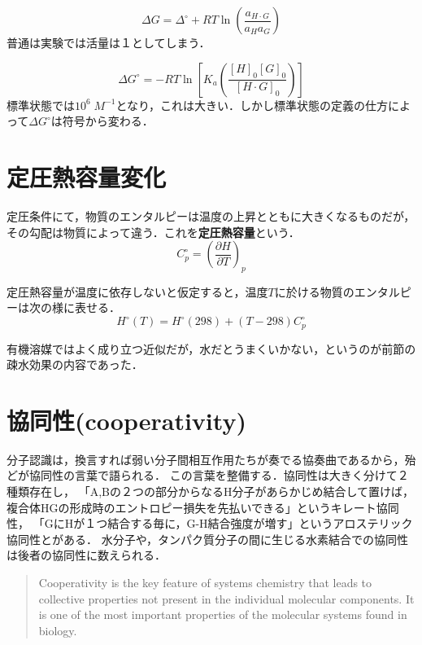 \documentclass[uplatex, dvipdfmx]{jsreport}
\begin{document}
\begin{remark}[標準状態と化学反応]
    \[\Delta G=\Delta^\circ + RT\ln\left(\frac{a_{H\cdot G}}{a_Ha_G}\right)\]
    普通は実験では活量は１としてしまう．

    \[ \Delta G^\circ = -RT\ln\left[K_a\left(\frac{[H]_0[G]_0}{[H\cdot G]_0}\right)\right] \]
    標準状態では$10^6\;M^{-1}$となり，これは大きい．しかし標準状態の定義の仕方によって$\Delta G^\circ$は符号から変わる．
\end{remark}

\section{定圧熱容量変化}

\begin{definition}[定圧熱容量]
    定圧条件にて，物質のエンタルピーは温度の上昇とともに大きくなるものだが，その勾配は物質によって違う．これを\textbf{定圧熱容量}という．
    \[C_p^\circ = \left(\frac{\partial H}{\partial T}\right)_p\]
\end{definition}
\begin{proposition}[enthalpyと定圧熱容量]
    定圧熱容量が温度に依存しないと仮定すると，温度$T$に於ける物質のエンタルピーは次の様に表せる．
    \[H^\circ(T)=H^\circ(298)+(T-298)C^\circ_p\]
\end{proposition}
\begin{remark}
    有機溶媒ではよく成り立つ近似だが，水だとうまくいかない，というのが前節の疎水効果の内容であった．
\end{remark}

\section{協同性(cooperativity)}
分子認識は，換言すれば弱い分子間相互作用たちが奏でる協奏曲であるから，殆どが協同性の言葉で語られる．
この言葉を整備する．協同性は大きく分けて２種類存在し，
「A,Bの２つの部分からなるH分子があらかじめ結合して置けば，複合体HGの形成時のエントロピー損失を先払いできる」というキレート協同性，
「GにHが１つ結合する毎に，G-H結合強度が増す」というアロステリック協同性とがある．
水分子や，タンパク質分子の間に生じる水素結合での協同性は後者の協同性に数えられる．

\begin{quote}
    Cooperativity is the key feature of systems chemistry that leads to collective properties not present in the individual molecular components. It is one of the most important properties of the molecular systems found in biology.\cite{What is cooperativity?}
\end{quote}
\end{document}
